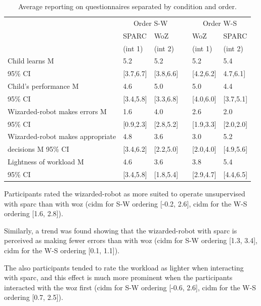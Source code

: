 \begin{table}[t]
	\caption{Average reporting on questionnaires separated by condition and order.}
	\centering
\begin{tabular}{@{}lllcll@{}}\toprule
	& \multicolumn{2}{c}{Order S-W} & \phantom{abc} & \multicolumn{2}{c}{Order W-S} \\
	\cmidrule{2-3} \cmidrule{5-6}
	& SPARC & WoZ && WoZ & SPARC \\
	& (int 1) & (int 2) && (int 1) & (int 2) \\
	\midrule					
		Child learns M & 5.2 & 5.2 && 5.2 & 5.4 \\
		95\% CI & [3.7,6.7] & [3.8,6.6] &&  [4.2,6.2] & 4.7,6.1]\\[.2cm]
		Child's performance M & 4.6 & 5.0 && 5.0 & 4.4 \\
		95\% CI & [3.4,5.8] & [3.3,6.8] && [4.0,6.0] & [3.7,5.1]\\[.2cm]
		Wizarded-robot makes errors M & 1.6 & 4.0 && 2.6 & 2.0 \\
		95\% CI & [0.9,2.3] & [2.8,5.2] && [1.9,3.3] & [2.0,2.0] \\[.2cm]
		Wizarded-robot makes appropriate & 4.8 & 3.6 && 3.0  & 5.2 \\
		decisions M 95\% CI & [3.4,6.2] & [2.2,5.0] && [2.0,4.0] & [4.9,5.6] \\ [.2cm]
		Lightness of workload M & 4.6  & 3.6 && 3.8  & 5.4 \\
		95\% CI & [3.4,5.8] & [1.8,5.4] && [2.9,4.7] & [4.4,6.5] \\
		\bottomrule
	\end{tabular}
	\label{tab:woz_quest_means}
\end{table}


Participants rated the wizarded-robot as more suited to operate unsupervised with \gls{sparc} than with \gls{woz}  (\gls{cidm} for S-W ordering [-0.2, 2.6], \gls{cidm} for the W-S ordering [1.6, 2.8]).

Similarly, a trend was found showing that the wizarded-robot with \gls{sparc} is perceived as making fewer errors than with \gls{woz} (\gls{cidm} for S-W ordering [1.3, 3.4], \gls{cidm} for the W-S ordering [0.1, 1.1]). 

The also participants tended to rate the workload as lighter when interacting with \gls{sparc}, and this effect is much more prominent when the participants interacted with the \gls{woz} first (\gls{cidm} for S-W ordering [-0.6, 2.6], \gls{cidm} for the W-S ordering [0.7, 2.5]).

